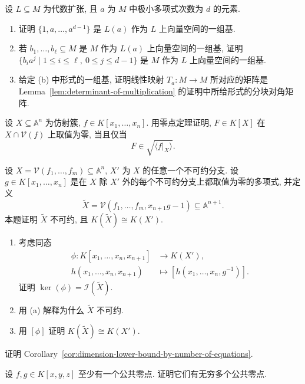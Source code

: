 \BookExerciseHeading
\begin{BookExercises}
  \item\label{ex:multiplication-map-block-diagonal-basis} 设 $L\subseteq M$ 为代数扩张, 且 $a$ 为 $M$ 中极小多项式次数为 $d$ 的元素.
  \begin{enumerate}
    \item 证明 $\{1,a,\ldots,a^{d-1}\}$ 是 $L(a)$ 作为 $L$ 上向量空间的一组基.
    \item 若 $b_{1},\ldots,b_{\ell}\subseteq M$ 是 $M$ 作为 $L(a)$ 上向量空间的一组基, 证明 $\{b_{i}a^{j}\mid1\leq i\leq\ell,\ 0\leq j\leq d-1\}$ 是 $M$ 作为 $L$ 上向量空间的一组基.
    \item 给定 (b) 中形式的一组基, 证明线性映射 $T_{a}:M\to M$ 所对应的矩阵是 Lemma~\ref{lem:determinant-of-multiplication} 的证明中所给形式的分块对角矩阵.
  \end{enumerate}
  \item\label{ex:radical-ideal-of-hypersurface-section} 设 $X\subseteq\mathbb{A}^{n}$ 为仿射簇, $f\in K[x_{1},\ldots,x_{n}]$. 用零点定理证明, $F\in K[X]$ 在 $X\cap\mathcal{V}(f)$ 上取值为零, 当且仅当
  \[
    F\in\sqrt{\langle f|_{X}\rangle}.
  \]
  \item\label{ex:adjoin-inverse-on-one-irreducible-component} 设 $X=\mathcal{V}(f_{1},\ldots,f_{m})\subseteq\mathbb{A}^{n}$, $X'$ 为 $X$ 的任意一个不可约分支. 设 $g\in K[x_{1},\ldots,x_{n}]$ 是在 $X$ 除 $X'$ 外的每个不可约分支上都取值为零的多项式, 并定义
  \[
    \widetilde{X}=\mathcal{V}(f_{1},\ldots,f_{m},x_{n+1}g-1)\subseteq\mathbb{A}^{n+1}.
  \]
  本题证明 $\widetilde{X}$ 不可约, 且 $K(\widetilde{X})\cong K(X')$.
  \begin{enumerate}
    \item 考虑同态
    \[
      \begin{aligned}
        \phi:K[x_{1},\ldots,x_{n},x_{n+1}]&\to K(X'),\\
        h(x_{1},\ldots,x_{n},x_{n+1})&\mapsto[h(x_{1},\ldots,x_{n},g^{-1})].
      \end{aligned}
    \]
    证明 $\ker(\phi)=\mathcal{I}(\widetilde{X})$.
    \item 用 (a) 解释为什么 $\widetilde{X}$ 不可约.
    \item 用 $[\phi]$ 证明 $K(\widetilde{X})\cong K(X')$.
  \end{enumerate}
  \item\label{ex:prove-dimension-lower-bound-by-number-of-equations} 证明 Corollary~\ref{cor:dimension-lower-bound-by-number-of-equations}.
  \item\label{ex:two-polynomials-with-infinitely-many-common-zeros} 设 $f,g\in K[x,y,z]$ 至少有一个公共零点. 证明它们有无穷多个公共零点.

\end{BookExercises}

